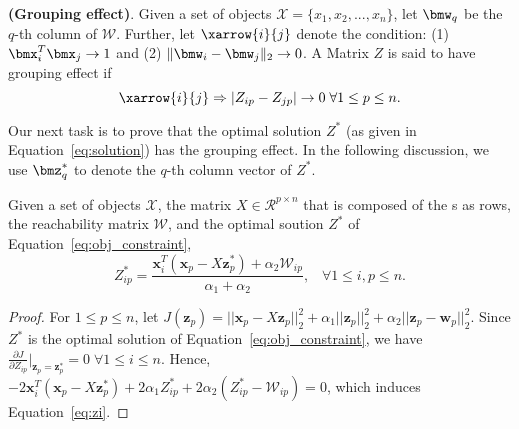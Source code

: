
\begin{definition}
\label{def:grouping}
\textbf{(Grouping effect)}. 
Given a set of objects $\mathcal{X} = \{x_1, x_2,..., x_n\}$,
let $\bmw_q$ be the $q$-th column of $\mathcal{W}$. 
Further, let $\xarrow{i}{j}$ denote the condition:
(1) $\bmx_i^T \bmx_j \rightarrow 1$ and 
(2) $\lVert \bmw_i - \bmw_j \rVert_2 \rightarrow 0$.
A Matrix $Z$ is said to have grouping effect
if
\[
\xarrow{i}{j} \Rightarrow |Z_{ip} - Z_{jp}| \rightarrow 0\; \forall 1 \leq p \leq n.
\]
\end{definition}

Our next task is to prove that the optimal solution $Z^*$ (as given in Equation~\ref{eq:solution})
has the grouping effect.
In the following discussion, we use $\bmz_q^*$ to denote the $q$-th column vector of $Z^*$.

\begin{lemma}
\label{lemma1}
Given a set of objects $\mathcal{X}$,
the matrix
$X\in \mathcal{R}^{p\times n}$ that is composed of the {\pev}s as rows,
 the reachability matrix $\mathcal{W}$,
 and the optimal soution $Z^*$ of Equation~\ref{eq:obj_constraint},
\begin{equation}
\label{eq:zi}
Z_{ip}^* = \frac{\bm{x}_i^T(\bm{x}_p-X\bm{z}_p^*) + \alpha_2 \mathcal{W}_{ip}}{\alpha_1+\alpha_2}, \;\;\; \forall 1 \leq i, p \leq n.
\end{equation}
\end{lemma}

\begin{proof}
For $1 \leq p \leq n$,
let $J(\bm{z}_p) =  ||\bm{x}_p-X\bm{z}_p||_2^2 + \alpha_1 ||\bm{z}_p||_2^2 + \alpha_2 ||\bm{z}_p-\bm{w}_p||_2^2$.
Since $Z^*$ is the optimal solution of Equation~\ref{eq:obj_constraint}, we have $\frac{\partial{J}}{\partial{Z}_{ip}}|_{\bm{z}_p = \bm{z}_p^*} = 0\; \forall 1\leq i \leq n$.
Hence, $-2\bm{x}_i^T(\bm{x}_p-X\bm{z}_p^*)+2\alpha_1Z_{ip}^*+2\alpha_2(Z_{ip}^*-\mathcal{W}_{ip}) = 0$,
which induces Equation~\ref{eq:zi}.
\end{proof}

